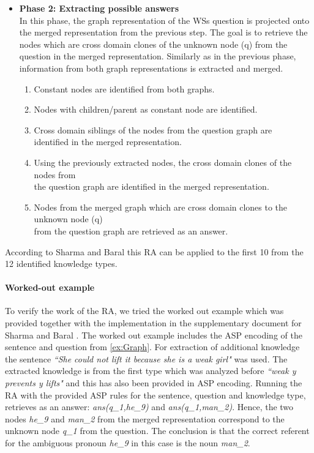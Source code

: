 \begin{itemize}
	\item \textbf{Phase 2: Extracting possible answers}\\
	In this phase, the graph representation of the WSs question is projected onto the merged representation from the previous step. The goal is to retrieve the nodes which are cross domain clones of the unknown node (q) from the question in the merged representation. Similarly as in the previous phase, information from both graph representations is extracted and merged.
	\begin{enumerate}
		\item Constant nodes are identified from both graphs.
		\item Nodes with children/parent as constant node are identified. 
		\item Cross domain siblings of the nodes from the question graph are \\ identified in the merged representation.
		\item Using the previously extracted nodes, the cross domain clones of the nodes from\\ the question graph are identified in the merged representation.
		\item Nodes from the merged graph which are cross domain clones to the unknown node (q)\\ from the question graph are retrieved as an answer.
	\end{enumerate}
\end{itemize}

According to Sharma and Baral \cite{2018CommonsenseKT} this RA can be applied to the first 10 from the 12 identified knowledge types.

\paragraph{Worked-out example} To verify the work of the RA, we tried the worked out example which was provided together with the implementation in the supplementary document for Sharma and Baral \cite{2018CommonsenseKT}. The worked out example includes the ASP encoding of the sentence and question from \ref{ex:Graph}. For extraction of additional knowledge the sentence \textit{``She could not lift it because she is a weak girl"} was used. The extracted knowledge is from the first type which was analyzed before \textit{``weak y prevents y lifts"} and this has also been provided in ASP encoding. Running the RA with the provided ASP rules for the sentence, question and knowledge type, retrieves as an answer: \textit{ans(q\_1,he\_9)} and \textit{ans(q\_1,man\_2)}. Hence, the two nodes \textit{he\_9} and \textit{man\_2} from the merged representation correspond to the unknown node \textit{q\_1} from the question. The conclusion is that the correct referent for the ambiguous pronoun \textit{he\_9} in this case is the noun \textit{man\_2}. 

